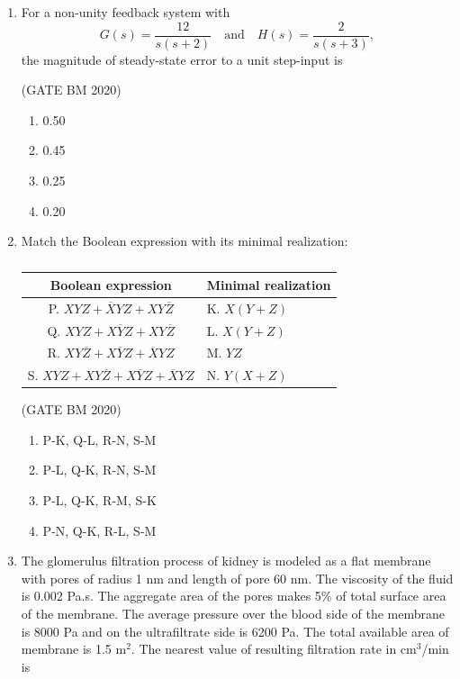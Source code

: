 \documentclass[journal]{IEEEtran}
\begin{document}
\begin{enumerate}
\item For a non-unity feedback system with 
\[
G(s) = \frac{12}{s(s+2)} \quad \text{and} \quad H(s) = \frac{2}{s(s+3)},
\]
the magnitude of steady-state error to a unit step-input is


\hfill(GATE BM 2020)
\begin{multicols}{4}
\begin{enumerate}
\item 0.50
\item 0.45
\item 0.25
\item 0.20
\end{enumerate}
\end{multicols}


\item Match the Boolean expression with its minimal realization:



	\begin{table}[H]
	\centering\normalsize
\begin{tabular}{|c|l|}
\hline
\textbf{Boolean expression} & \textbf{Minimal realization} \\
\hline
P. $XYZ + \overline{X}YZ + XY\overline{Z}$ & K. $X(Y+Z)$ \\\hline
Q. $XYZ + X\overline{Y}Z + XY\overline{Z}$ & L. $X(Y+Z)$ \\\hline
R. $XY\overline{Z} + X\overline{Y}Z + \overline{X}YZ$ & M. $YZ$ \\\hline
S. $XYZ + XY\overline{Z} + X\overline{Y}Z + \overline{X}YZ$ & N. $Y(X+Z)$ \\
\hline
\end{tabular}
	\caption{}
	\label{tab:Q45}
\end{table}


\hfill(GATE BM 2020)
\begin{multicols}{2}
\begin{enumerate}
\item P-K, Q-L, R-N, S-M
\item P-L, Q-K, R-N, S-M
\item P-L, Q-K, R-M, S-K
\item P-N, Q-K, R-L, S-M
\end{enumerate}
\end{multicols}

\item The glomerulus filtration process of kidney is modeled as a flat membrane with pores of radius 1 nm and length of pore 60 nm. The viscosity of the fluid is 0.002 Pa.s. The aggregate area of the pores makes 5\% of total surface area of the membrane. The average pressure over the blood side of the membrane is 8000 Pa and on the ultrafiltrate side is 6200 Pa. The total available area of membrane is 1.5 m$^2$. The nearest value of resulting filtration rate in cm$^3$/min is



\end{enumerate}
\end{document}
